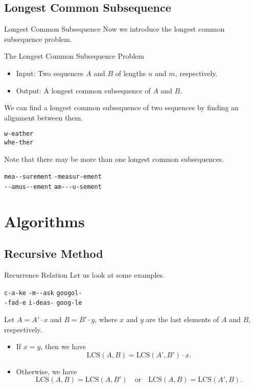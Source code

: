 \documentclass{beamer}
\begin{document}
\subsection{Longest Common Subsequence}
\begin{frame}[fragile]{Longest Common Subsequence}
  Now we introduce the longest common subsequence problem. \pause
  \begin{block}{The Longest Common Subsequence Problem}
    \begin{itemize}
      \item Input: Two sequences $A$ and $B$ of lengths $n$ and $m$,
      respectively.
      \item Output: A longest common subsequence of $A$ and $B$.
    \end{itemize}
    \pause
  \end{block}
  We can find a longest common subsequence of two sequences by finding an
  alignment between them. \pause
  \begin{center}
    \lstinline{w-eather} \\
    \lstinline{whe-ther}
  \end{center}
  \pause
  Note that there may be more than one longest common subsequences. \pause
  \begin{center}
    \lstinline{mea--surement} \qquad \lstinline{-measur-ement} \\
    \lstinline{--amus--ement} \qquad \lstinline{am---u-sement}
  \end{center}
\end{frame}

\section{Algorithms}
\subsection{Recursive Method}
\begin{frame}{Recurrence Relation}
  Let us look at some examples.
  \begin{center}
    \lstinline{c-a-ke} \quad \lstinline{-m--ask} \quad \lstinline{googol-} \\
    \lstinline{-fad-e} \quad \lstinline{i-deas-} \quad \lstinline{goog-le}
  \end{center}
  \pause
  Let $A = A' \cdot x$ and $B = B' \cdot y$, where $x$ and $y$ are the last
  elements of $A$ and $B$, respectively. \pause
  \begin{itemize}
    \item If $x = y$, then we have
    \begin{equation*}
      \text{LCS}(A, B) = \text{LCS}(A', B') \cdot x.
    \end{equation*}
    \pause
    \vspace{-1em}
    \item Otherwise, we have
    \begin{equation*}
      \text{LCS}(A, B) = \text{LCS}(A, B')
      \quad \text{or} \quad
      \text{LCS}(A, B) = \text{LCS}(A', B).
    \end{equation*}
  \end{itemize}
\end{frame}
\end{document}
